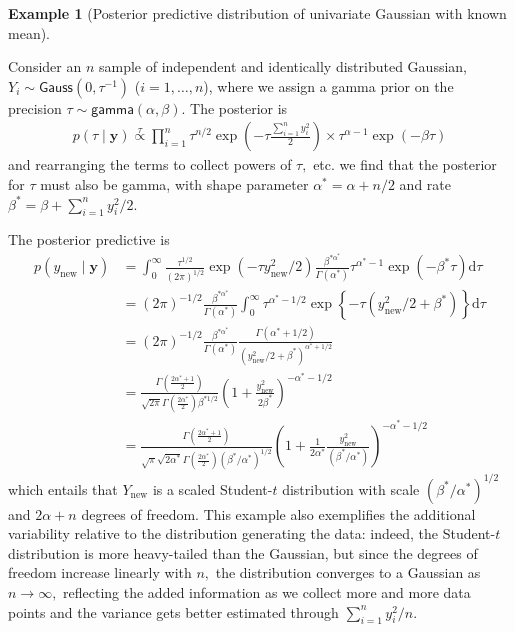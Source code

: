 \documentclass[
  11pt,
  letterpaper,
]{scrbook}
\theoremstyle{definition}
\newtheorem{example}{Example}[chapter]
\theoremstyle{plain}
\theoremstyle{plain}
\theoremstyle{plain}
\theoremstyle{definition}
\theoremstyle{definition}
\theoremstyle{plain}
\theoremstyle{plain}
\theoremstyle{remark}
\begin{document}
\begin{example}[Posterior predictive distribution of univariate Gaussian
with known
mean]\protect\hypertarget{exm-normal-post-pred}{}\label{exm-normal-post-pred}

Consider an \(n\) sample of independent and identically distributed
Gaussian, \(Y_i \sim \mathsf{Gauss}(0, \tau^{-1})\)
(\(i=1, \ldots, n\)), where we assign a gamma prior on the precision
\(\tau \sim \mathsf{gamma}(\alpha, \beta).\) The posterior is
\begin{align*}
p(\tau \mid \boldsymbol{y}) \stackrel{\tau}{\propto} \prod_{i=1}^n \tau^{n/2}\exp\left(-\tau \frac{\sum_{i=1}^n{y_i^2}}{2}\right) \times \tau^{\alpha-1} \exp(-\beta \tau)
\end{align*} and rearranging the terms to collect powers of \(\tau,\)
etc. we find that the posterior for \(\tau\) must also be gamma, with
shape parameter \(\alpha^* = \alpha + n/2\) and rate
\(\beta^* = \beta + \sum_{i=1}^n y_i^2/2.\)

The posterior predictive is \begin{align*}
p(y_{\text{new}} \mid \boldsymbol{y}) &= \int_0^\infty \frac{\tau^{1/2}}{(2\pi)^{1/2}}\exp(-\tau y_{\text{new}}^2/2) \frac{\beta^{*\alpha^*}}{\Gamma(\alpha^*)}\tau^{\alpha^*-1}\exp(-\beta^* \tau) \mathrm{d} \tau 
\\&= (2\pi)^{-1/2} \frac{\beta^{*\alpha^*}}{\Gamma(\alpha^*)} \int_0^\infty\tau^{\alpha^*-1/2} \exp\left\{- \tau (y_{\text{new}}^2/2 + \beta^*)\right\} \mathrm{d} \tau
\\&= (2\pi)^{-1/2} \frac{\beta^{*\alpha^*}}{\Gamma(\alpha^*)} \frac{\Gamma(\alpha^* + 1/2)}{(y_{\text{new}}^2/2 + \beta^*)^{\alpha^*+1/2}}
\\&= \frac{\Gamma\left(\frac{2\alpha^* + 1}{2}\right)}{\sqrt{2\pi}\Gamma\left(\frac{2\alpha^*}{2}\right)\beta^{*1/2}} \left( 1+ \frac{y_{\text{new}}^2}{2\beta^*}\right)^{-\alpha^*-1/2}
\\&= \frac{\Gamma\left(\frac{2\alpha^* + 1}{2}\right)}{\sqrt{\pi}\sqrt{ 2\alpha^*}\Gamma\left(\frac{2\alpha^*}{2}\right)(\beta^*/\alpha^*)^{1/2}} \left( 1+ \frac{1}{2\alpha^*}\frac{y_{\text{new}}^2}{(\beta^*/\alpha^*)}\right)^{-\alpha^*-1/2}
\end{align*} which entails that \(Y_{\text{new}}\) is a scaled
Student-\(t\) distribution with scale \((\beta^*/\alpha^*)^{1/2}\) and
\(2\alpha+n\) degrees of freedom. This example also exemplifies the
additional variability relative to the distribution generating the data:
indeed, the Student-\(t\) distribution is more heavy-tailed than the
Gaussian, but since the degrees of freedom increase linearly with \(n,\)
the distribution converges to a Gaussian as \(n \to \infty,\) reflecting
the added information as we collect more and more data points and the
variance gets better estimated through \(\sum_{i=1}^n y_i^2/n.\)

\end{example}
\end{document}
